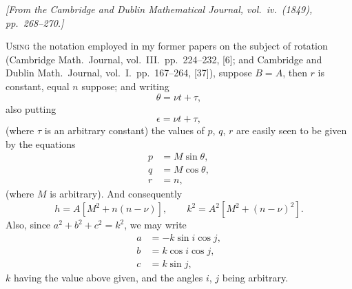 \documentclass[11pt,a4paper]{article}
\theoremstyle{definition}
\begin{document}
\begin{flushright}
\textit{[From the Cambridge and Dublin Mathematical Journal, vol.\ iv.\ (1849), pp.\ 268--270.]}
\end{flushright}

\setcounter{page}{462}

\textsc{Using} the notation employed in my former papers on the subject of rotation (Cambridge Math.\ Journal, vol.~III.\ pp.~224--232, [6]; and Cambridge and Dublin Math.\ Journal, vol.~I.\ pp.~167--264, [37]), suppose $B = A$, then $r$ is constant, equal $n$ suppose; and writing
\[
\theta = \nu t + \tau,
\]
also putting
\[
\epsilon = \nu t + \tau,
\]
(where $\tau$ is an arbitrary constant) the values of $p$, $q$, $r$ are easily seen to be given by the equations
\begin{align*}
p &= M\sin\theta, \\
q &= M\cos\theta, \\
r &= n,
\end{align*}
(where $M$ is arbitrary). And consequently
\[
h = A[M^{2} + n(n - \nu)], \qquad k^{2} = A^{2}[M^{2} + (n - \nu)^{2}].
\]
Also, since $a^{2} + b^{2} + c^{2} = k^{2}$, we may write
\begin{align*}
a &= -k\sin i\cos j, \\
b &= k\cos i\cos j, \\
c &= k\sin j,
\end{align*}
$k$ having the value above given, and the angles $i$, $j$ being arbitrary.

\newpage

\setcounter{page}{463}
\end{document}
